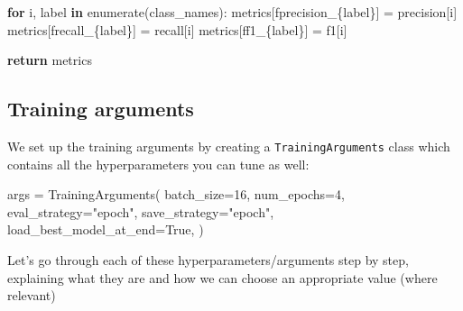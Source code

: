 \documentclass[
  letterpaper,
  DIV=11,
  numbers=noendperiod]{scrreprt}
\newenvironment{Shaded}{\begin{snugshade}}{\end{snugshade}}
\newcommand{\BuiltInTok}[1]{\textcolor[rgb]{0.00,0.23,0.31}{#1}}
\newcommand{\ControlFlowTok}[1]{\textcolor[rgb]{0.00,0.23,0.31}{\textbf{#1}}}
\newcommand{\DecValTok}[1]{\textcolor[rgb]{0.68,0.00,0.00}{#1}}
\newcommand{\KeywordTok}[1]{\textcolor[rgb]{0.00,0.23,0.31}{\textbf{#1}}}
\newcommand{\NormalTok}[1]{\textcolor[rgb]{0.00,0.23,0.31}{#1}}
\newcommand{\OperatorTok}[1]{\textcolor[rgb]{0.37,0.37,0.37}{#1}}
\newcommand{\SpecialCharTok}[1]{\textcolor[rgb]{0.37,0.37,0.37}{#1}}
\newcommand{\SpecialStringTok}[1]{\textcolor[rgb]{0.13,0.47,0.30}{#1}}
\newcommand{\StringTok}[1]{\textcolor[rgb]{0.13,0.47,0.30}{#1}}
\newcommand{\VariableTok}[1]{\textcolor[rgb]{0.07,0.07,0.07}{#1}}
\begin{document}
\begin{Shaded}
\begin{Highlighting}[]
    \ControlFlowTok{for}\NormalTok{ i, label }\KeywordTok{in} \BuiltInTok{enumerate}\NormalTok{(class\_names):}
\NormalTok{        metrics[}\SpecialStringTok{f\textquotesingle{}precision\_}\SpecialCharTok{\{}\NormalTok{label}\SpecialCharTok{\}}\SpecialStringTok{\textquotesingle{}}\NormalTok{] }\OperatorTok{=}\NormalTok{ precision[i]}
\NormalTok{        metrics[}\SpecialStringTok{f\textquotesingle{}recall\_}\SpecialCharTok{\{}\NormalTok{label}\SpecialCharTok{\}}\SpecialStringTok{\textquotesingle{}}\NormalTok{] }\OperatorTok{=}\NormalTok{ recall[i]}
\NormalTok{        metrics[}\SpecialStringTok{f\textquotesingle{}f1\_}\SpecialCharTok{\{}\NormalTok{label}\SpecialCharTok{\}}\SpecialStringTok{\textquotesingle{}}\NormalTok{] }\OperatorTok{=}\NormalTok{ f1[i]}

    \ControlFlowTok{return}\NormalTok{ metrics}
\end{Highlighting}
\end{Shaded}

\subsection{Training arguments}\label{training-arguments}

We set up the training arguments by creating a
\texttt{TrainingArguments} class which contains all the hyperparameters
you can tune as well:

\begin{Shaded}
\begin{Highlighting}[]
\NormalTok{args }\OperatorTok{=}\NormalTok{ TrainingArguments(}
\NormalTok{    batch\_size}\OperatorTok{=}\DecValTok{16}\NormalTok{,}
\NormalTok{    num\_epochs}\OperatorTok{=}\DecValTok{4}\NormalTok{,}
\NormalTok{    eval\_strategy}\OperatorTok{=}\StringTok{"epoch"}\NormalTok{,}
\NormalTok{    save\_strategy}\OperatorTok{=}\StringTok{"epoch"}\NormalTok{,}
\NormalTok{    load\_best\_model\_at\_end}\OperatorTok{=}\VariableTok{True}\NormalTok{,}
\NormalTok{)}
\end{Highlighting}
\end{Shaded}

Let's go through each of these hyperparameters/arguments step by step,
explaining what they are and how we can choose an appropriate value
(where relevant)
\end{document}
